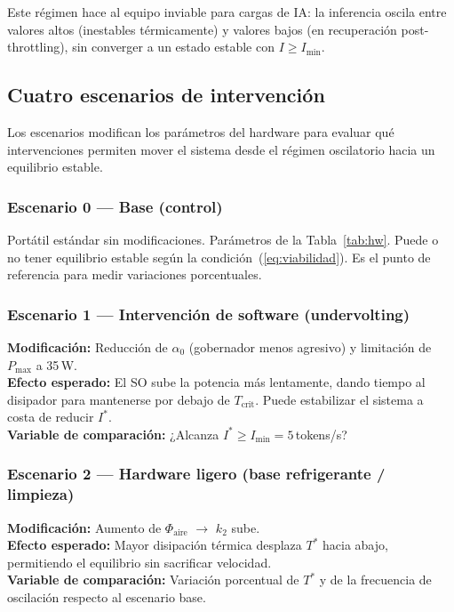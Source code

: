 \documentclass[10pt, twocolumn]{article}
\begin{document}
Este régimen hace al equipo inviable para cargas de IA: la inferencia oscila entre
valores altos (inestables térmicamente) y valores bajos (en recuperación
post-throttling), sin converger a un estado estable con $I \geq I_{\min}$.

\subsection{Cuatro escenarios de intervención}

Los escenarios modifican los parámetros del hardware para evaluar qué
intervenciones permiten mover el sistema desde el régimen oscilatorio hacia un
equilibrio estable.

\subsubsection*{Escenario 0 --- Base (control)}
Portátil estándar sin modificaciones. Parámetros de la Tabla~\ref{tab:hw}.
Puede o no tener equilibrio estable según la condición~(\ref{eq:viabilidad}).
Es el punto de referencia para medir variaciones porcentuales.

\subsubsection*{Escenario 1 --- Intervención de software (undervolting)}
\textbf{Modificación:} Reducción de $\alpha_0$ (gobernador menos agresivo) y
limitación de $P_{\max}$ a 35\,W.\\
\textbf{Efecto esperado:} El SO sube la potencia más lentamente, dando tiempo al
disipador para mantenerse por debajo de $T_{\text{crit}}$. Puede estabilizar el
sistema a costa de reducir $I^*$.\\
\textbf{Variable de comparación:} ¿Alcanza $I^* \geq I_{\min} = 5$\,tokens/s?

\subsubsection*{Escenario 2 --- Hardware ligero (base refrigerante / limpieza)}
\textbf{Modificación:} Aumento de $\Phi_{\text{aire}}$ $\rightarrow$ $k_2$ sube.\\
\textbf{Efecto esperado:} Mayor disipación térmica desplaza $T^*$ hacia abajo,
permitiendo el equilibrio sin sacrificar velocidad.\\
\textbf{Variable de comparación:} Variación porcentual de $T^*$ y de la frecuencia
de oscilación respecto al escenario base.
\end{document}
